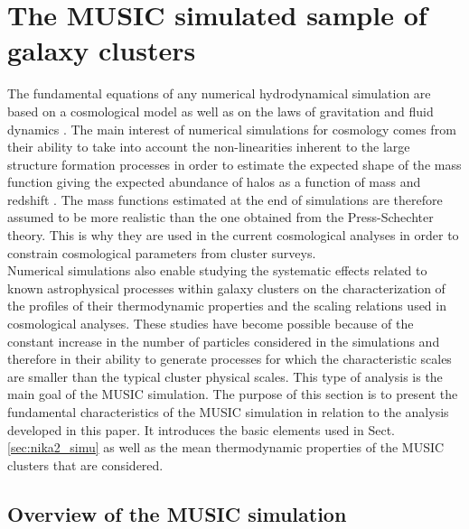 \documentclass[twocolumn,traditabstract]{aa}
\begin{document}
\section{The MUSIC simulated sample of galaxy clusters}\label{sec:music_sample}

The fundamental equations of any numerical hydrodynamical simulation are based on a cosmological model as well as on the laws of gravitation and fluid dynamics \citep[See the review of][for more details on N-body simulation techniques.]{dol08}. The main interest of numerical simulations for cosmology comes from their ability to take into account the non-linearities inherent to the large structure formation processes in order to estimate the expected shape of the mass function giving the expected abundance of halos as a function of mass and redshift \citep[\emph{e.g.}][]{tin08}. The mass functions estimated at the end of simulations are therefore assumed to be more realistic than the one obtained from the Press-Schechter theory. This is why they are used in the current cosmological analyses in order to constrain cosmological parameters from cluster surveys.\\

Numerical simulations also enable studying the systematic effects related to known astrophysical processes within galaxy clusters on the characterization of the profiles of their thermodynamic properties and the scaling relations used in cosmological analyses. These studies have become possible because of the constant increase in the number of particles considered in the simulations and therefore in their ability to generate processes for which the characteristic scales are smaller than the typical cluster physical scales. This type of analysis is the main goal of the MUSIC simulation. The purpose of this section is to present the fundamental characteristics of the MUSIC simulation in relation to the analysis developed in this paper. It introduces the basic elements used in Sect. \ref{sec:nika2_simu} as well as the mean thermodynamic properties of the MUSIC clusters that are considered.

\subsection{Overview of the MUSIC simulation}\label{subsec:music_overview}
\end{document}
